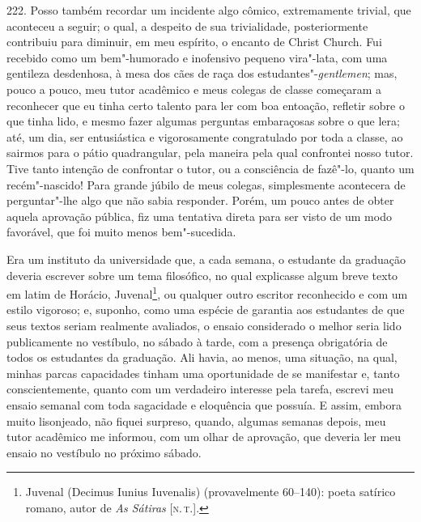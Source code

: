 222. Posso também recordar um incidente algo cômico, extremamente
trivial, que aconteceu a seguir; o qual, a despeito de sua trivialidade,
posteriormente contribuiu para diminuir, em meu espírito, o encanto de
Christ Church. Fui recebido como um bem"-humorado e inofensivo pequeno
vira"-lata, com uma gentileza desdenhosa, à mesa dos cães de raça dos
estudantes"-\emph{gentlemen}; mas, pouco a pouco, meu tutor acadêmico e
meus colegas de classe começaram a reconhecer que eu tinha certo talento
para ler com boa entoação, refletir sobre o que tinha lido, e mesmo
fazer algumas perguntas embaraçosas sobre o que lera; até, um dia, ser
entusiástica e vigorosamente congratulado por toda a classe, ao sairmos
para o pátio quadrangular, pela maneira pela qual confrontei nosso
tutor. Tive tanto intenção de confrontar o tutor, ou a consciência de
fazê"-lo, quanto um recém"-nascido! Para grande júbilo de meus colegas,
simplesmente acontecera de perguntar"-lhe algo que não sabia responder.
Porém, um pouco antes de obter aquela aprovação pública, fiz uma
tentativa direta para ser visto de um modo favorável, que foi muito
menos bem"-sucedida.

Era um instituto da universidade que, a cada semana, o estudante da
graduação deveria escrever sobre um tema filosófico, no qual explicasse
algum breve texto em latim de Horácio, Juvenal\footnote{Juvenal (Decimus
  Iunius Iuvenalis) (provavelmente 60--140): poeta satírico romano, autor
  de \emph{As Sátiras} {[}\textsc{n.\,t.}{]}.}, ou qualquer outro escritor
reconhecido e com um estilo vigoroso; e, suponho, como uma espécie de
garantia aos estudantes de que seus textos seriam realmente avaliados, o
ensaio considerado o melhor seria lido publicamente no vestíbulo, no
sábado à tarde, com a presença obrigatória de todos os estudantes da
graduação. Ali havia, ao menos, uma situação, na qual, minhas parcas
capacidades tinham uma oportunidade de se manifestar e, tanto
conscientemente, quanto com um verdadeiro interesse pela tarefa, escrevi
meu ensaio semanal com toda sagacidade e eloquência que possuía. E
assim, embora muito lisonjeado, não fiquei surpreso, quando, algumas
semanas depois, meu tutor acadêmico me informou, com um olhar de
aprovação, que deveria ler meu ensaio no vestíbulo no próximo sábado.

